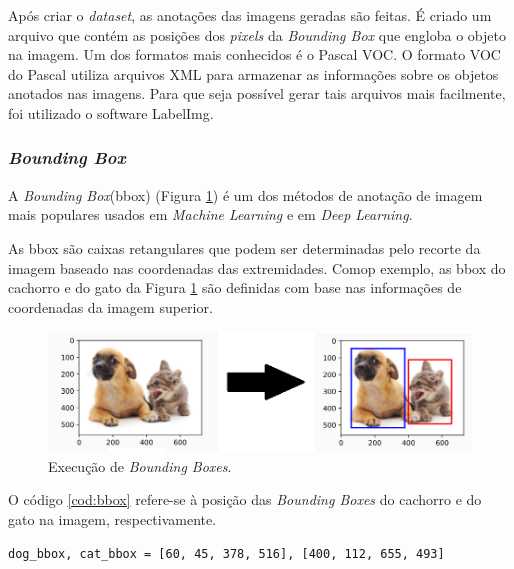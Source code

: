 Após criar o \textit{dataset}, as anotações das imagens geradas são feitas. É criado um arquivo que contém as posições dos \textit{pixels} da \textit{Bounding Box} que engloba o objeto na imagem. Um dos formatos mais conhecidos é o Pascal VOC. O formato VOC do Pascal utiliza arquivos XML para armazenar as informações sobre os objetos anotados nas imagens. Para que seja possível gerar tais arquivos mais facilmente, foi utilizado o software LabelImg.


\subsubsection*{\textit{Bounding Box}}

A \textit{Bounding Box}(bbox) (Figura \ref{fig:boundingBox}) é um dos métodos de anotação de imagem mais populares usados em \textit{Machine Learning} e em \textit{Deep Learning}.

As bbox são caixas retangulares que podem ser determinadas pelo recorte da imagem baseado nas coordenadas das extremidades. Comop exemplo, as bbox do cachorro e do gato da Figura \ref{fig:boundingBox} são definidas com base nas informações de coordenadas da imagem superior. \cite{allDeep}

\begin{figure}[H]
		\centering
		\includegraphics[scale=0.6]{figuras/MachineLearning/catDog.png}
		\caption{Execução de \textit{Bounding Boxes}.}
		\label{fig:boundingBox}
\end{figure}

O código \ref{cod:bbox} refere-se à posição das \textit{Bounding Boxes} do cachorro e do gato na imagem, respectivamente.

\begin{lstlisting}[caption=Posições de X e Y nas \textit{Bounding Boxes}, label=cod:bbox]
         dog_bbox, cat_bbox = [60, 45, 378, 516], [400, 112, 655, 493]
\end{lstlisting}


